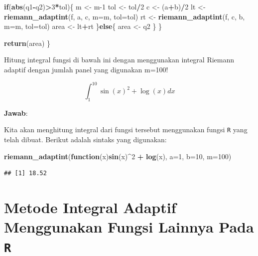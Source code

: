 \documentclass[]{book}
\newenvironment{Shaded}{\begin{snugshade}}{\end{snugshade}}
\newcommand{\ControlFlowTok}[1]{\textcolor[rgb]{0.13,0.29,0.53}{\textbf{#1}}}
\newcommand{\DataTypeTok}[1]{\textcolor[rgb]{0.13,0.29,0.53}{#1}}
\newcommand{\DecValTok}[1]{\textcolor[rgb]{0.00,0.00,0.81}{#1}}
\newcommand{\KeywordTok}[1]{\textcolor[rgb]{0.13,0.29,0.53}{\textbf{#1}}}
\newcommand{\NormalTok}[1]{#1}
\newcommand{\OperatorTok}[1]{\textcolor[rgb]{0.81,0.36,0.00}{\textbf{#1}}}
\newcommand{\StringTok}[1]{\textcolor[rgb]{0.31,0.60,0.02}{#1}}
\theoremstyle{definition}
\theoremstyle{definition}
\theoremstyle{definition}
\theoremstyle{remark}
\let\BeginKnitrBlock\begin \let\EndKnitrBlock\end
\begin{document}
\begin{Shaded}
\begin{Highlighting}[]
    \ControlFlowTok{if}\NormalTok{(}\KeywordTok{abs}\NormalTok{(q1}\OperatorTok{-}\NormalTok{q2)}\OperatorTok{>}\DecValTok{3}\OperatorTok{*}\NormalTok{tol)\{}
\NormalTok{      m <-}\StringTok{ }\NormalTok{m}\DecValTok{-1}
\NormalTok{      tol <-}\StringTok{ }\NormalTok{tol}\OperatorTok{/}\DecValTok{2}
\NormalTok{      c <-}\StringTok{ }\NormalTok{(a}\OperatorTok{+}\NormalTok{b)}\OperatorTok{/}\DecValTok{2}
\NormalTok{      lt <-}\StringTok{ }\KeywordTok{riemann_adaptint}\NormalTok{(f, a, c, }\DataTypeTok{m=}\NormalTok{m, }\DataTypeTok{tol=}\NormalTok{tol)}
\NormalTok{      rt <-}\StringTok{ }\KeywordTok{riemann_adaptint}\NormalTok{(f, c, b, }\DataTypeTok{m=}\NormalTok{m, }\DataTypeTok{tol=}\NormalTok{tol) }
\NormalTok{      area <-}\StringTok{ }\NormalTok{lt}\OperatorTok{+}\NormalTok{rt}
\NormalTok{    \}}\ControlFlowTok{else}\NormalTok{\{}
\NormalTok{      area <-}\StringTok{ }\NormalTok{q2}
\NormalTok{    \}}
\NormalTok{  \}}
  
  \KeywordTok{return}\NormalTok{(area)}
\NormalTok{\}}
\end{Highlighting}
\end{Shaded}

\BeginKnitrBlock{example}
\protect\hypertarget{exm:adaptexm}{}{\label{exm:adaptexm} }Hitung integral fungsi di bawah ini dengan menggunakan integral Riemann adaptif dengan jumlah panel yang digunakan m=100!
\EndKnitrBlock{example}

\[
\int_{1}^{10} \sin\left(x\right)^2+\log\left(x\right)dx
\]

\textbf{Jawab}:

Kita akan menghitung integral dari fungsi tersebut menggunakan fungsi \texttt{R} yang telah dibuat. Berikut adalah sintaks yang digunakan:

\begin{Shaded}
\begin{Highlighting}[]
\KeywordTok{riemann_adaptint}\NormalTok{(}\ControlFlowTok{function}\NormalTok{(x)}\KeywordTok{sin}\NormalTok{(x)}\OperatorTok{^}\DecValTok{2} \OperatorTok{+}\StringTok{ }\KeywordTok{log}\NormalTok{(x),}
                 \DataTypeTok{a=}\DecValTok{1}\NormalTok{, }\DataTypeTok{b=}\DecValTok{10}\NormalTok{, }\DataTypeTok{m=}\DecValTok{100}\NormalTok{)}
\end{Highlighting}
\end{Shaded}

\begin{verbatim}
## [1] 18.52
\end{verbatim}

\hypertarget{metode-integral-adaptif-menggunakan-fungsi-lainnya-pada-r}{%
\section{\texorpdfstring{Metode Integral Adaptif Menggunakan Fungsi Lainnya Pada \texttt{R}}{Metode Integral Adaptif Menggunakan Fungsi Lainnya Pada R}}\label{metode-integral-adaptif-menggunakan-fungsi-lainnya-pada-r}}
\end{document}
